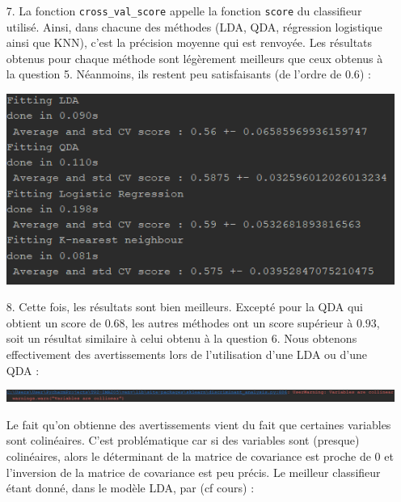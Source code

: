 \documentclass[a4paper, 10pt]{article}
\begin{document}
\begin{itemize}
	\item[7.] La fonction \texttt{cross\_val\_score} appelle la fonction \texttt{score} du classifieur utilisé. Ainsi, dans chacune des méthodes (LDA, QDA, régression logistique ainsi que KNN), c'est la précision moyenne qui est renvoyée. Les résultats obtenus pour chaque méthode sont légèrement meilleurs que ceux obtenus à la question 5. Néanmoins, ils restent peu satisfaisants (de l'ordre de $0.6$) : \\
	
\begin{center}
	\includegraphics[scale=0.9]{scores.PNG}
\end{center}
	
\hspace*{2mm}
	
	\item[8.] Cette fois, les résultats sont bien meilleurs. Excepté pour la QDA qui obtient un score de $0.68$, les autres méthodes ont un score supérieur à $0.93$, soit un résultat similaire à celui obtenu à la question $6$. Nous obtenons effectivement des avertissements lors de l'utilisation d'une LDA ou d'une QDA : \\
	
\begin{center}
	\includegraphics[scale=0.6]{discriminant_analysis_warning.PNG}
\end{center}
	
\hspace*{2mm}	
	
Le fait qu'on obtienne des avertissements vient du fait que certaines variables sont colinéaires. C'est problématique car si des variables sont (presque) colinéaires, alors le déterminant de la matrice de covariance est proche de $0$ et l'inversion de la matrice de covariance est peu précis. Le meilleur classifieur étant donné, dans le modèle LDA, par (cf cours) :


\end{itemize}
\end{document}
